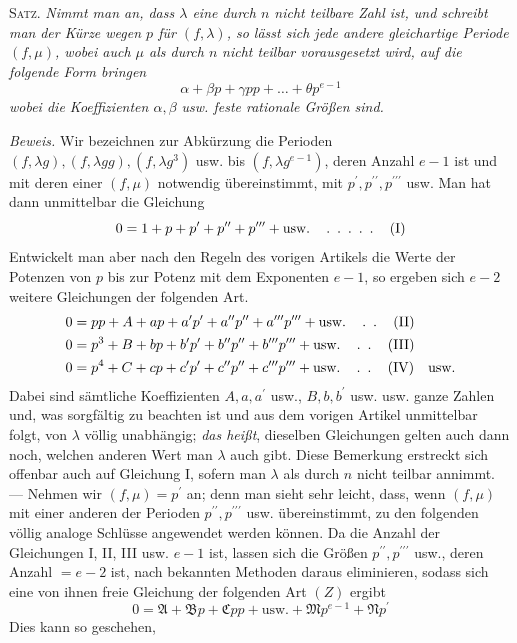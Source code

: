 \textsc{Satz.} \textit{Nimmt man an, dass \(\lambda\) eine durch \(n\) nicht teilbare Zahl ist, und schreibt man} \textit{der Kürze wegen \(p\) für \((f,\allowbreak \lambda)\), so lässt sich jede andere gleichartige Periode \((f,\allowbreak \mu)\), wobei auch \(\mu\) als durch \(n\)} \textit{nicht teilbar vorausgesetzt wird, auf die folgende Form bringen} \[\alpha+\beta p+\gamma pp+\ldots+\theta p^{e-1}\] \textit{wobei die Koeffizienten \(\alpha,\allowbreak \beta\) usw. feste rationale Größen sind.}

\textit{Beweis.} Wir bezeichnen zur Abkürzung die Perioden \((f,\allowbreak \lambda g),\allowbreak (f,\allowbreak \lambda gg),\allowbreak (f,\allowbreak \lambda g^3)\) usw. bis \((f,\allowbreak \lambda g^{e-1})\), deren Anzahl \(e-1\) ist und mit deren einer \((f,\allowbreak \mu)\) notwendig übereinstimmt, mit \(p^{\prime},\allowbreak p^{\prime\prime},\allowbreak p^{\prime\prime\prime}\) usw. Man hat dann unmittelbar die Gleichung \[0=1+p+p^{\prime}+p^{\prime\prime}+p^{\prime\prime\prime}+\text{usw.}\quad\mathinner{\ldotp\ \ldotp\ \ldotp\ \ldotp\ \ldotp}\quad(\mathrm I)\] Entwickelt man aber nach den Regeln des vorigen Artikels die Werte der Potenzen von \(p\) bis zur Potenz mit dem Exponenten \(e-1\), so ergeben sich \(e-2\) weitere Gleichungen der folgenden Art. \[\begin{aligned}0&=pp+A+ap+a^{\prime} p^{\prime}+a^{\prime\prime} p^{\prime\prime}+a^{\prime\prime\prime} p^{\prime\prime\prime}+\text{usw.}\quad\mathinner{\ldotp\ \ldotp}\quad(\mathrm{II})\\0&=p^3+B+bp+b^{\prime} p^{\prime}+b^{\prime\prime} p^{\prime\prime}+b^{\prime\prime\prime} p^{\prime\prime\prime}+\text{usw.}\quad\mathinner{\ldotp\ \ldotp}\quad(\mathrm{III})\\0&=p^4+C+cp+c^{\prime} p^{\prime}+c^{\prime\prime} p^{\prime\prime}+c^{\prime\prime\prime} p^{\prime\prime\prime}+\text{usw.}\quad\mathinner{\ldotp\ \ldotp}\quad(\mathrm{IV})\quad\text{usw.}\end{aligned}\] Dabei sind sämtliche Koeffizienten \(A,\allowbreak a,\allowbreak a^{\prime}\) usw., \(B,\allowbreak b,\allowbreak b^{\prime}\) usw. usw. ganze Zahlen und, was sorgfältig zu beachten ist und aus dem vorigen Artikel unmittelbar folgt, von \(\lambda\) völlig unabhängig; \textit{das heißt}, dieselben Gleichungen gelten auch dann noch, welchen anderen Wert man \(\lambda\) auch gibt. Diese Bemerkung erstreckt sich offenbar auch auf Gleichung I, sofern man \(\lambda\) als durch \(n\) nicht teilbar annimmt. --- Nehmen wir \((f,\allowbreak \mu)=p^{\prime}\) an; denn man sieht sehr leicht, dass, wenn \((f,\allowbreak \mu)\) mit einer anderen der Perioden \(p^{\prime\prime},\allowbreak p^{\prime\prime\prime}\) usw. übereinstimmt, zu den folgenden völlig analoge Schlüsse angewendet werden können. Da die Anzahl der Gleichungen I, II, III usw. \(e-1\) ist, lassen sich die Größen \(p^{\prime\prime},\allowbreak p^{\prime\prime\prime}\) usw., deren Anzahl \(=e-2\) ist, nach bekannten Methoden daraus eliminieren, sodass sich eine von ihnen freie Gleichung der folgenden Art \((Z)\) ergibt \[0=\mathfrak A+\mathfrak Bp+\mathfrak Cpp+\text{usw.}+\mathfrak Mp^{e-1}+\mathfrak Np^{\prime}\] Dies kann so geschehen, 
